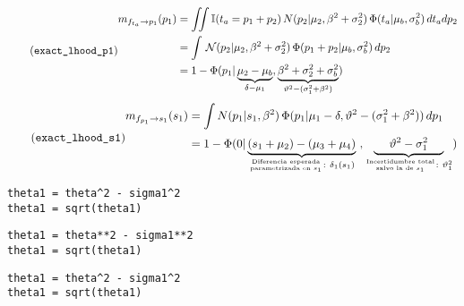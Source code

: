 \documentclass[article]{jss}
\newif\ifen
\newcommand{\en}[1]{\ifen#1\fi}
\newcommand{\N}{\mathcal{N}}
\newcommand\hfrac[2]{\genfrac{}{}{0pt}{}{#1}{#2}} %
\begin{document}
%
\begin{equation}\label{eq:m_fta_p_inicial} \tag{\texttt{exact\_lhood\_p1}}
\begin{split}
m_{f_{t_a} \rightarrow p_1}(p_1)  & = \iint \mathbb{I}( t_a = p_1 + p_2) \, N(p_2| \mu_2, \beta^2 + \sigma_2^2 ) \, \Phi (t_a| \mu_b , \sigma_b^2 ) \, dt_a dp_2 \\
& = \int  \, \N(p_2| \mu_2, \beta^2 + \sigma_2^2 ) \, \Phi (p_1 + p_2| \mu_b , \sigma_b^2 ) \, dp_2 \\
& = 1 - \Phi( p_1 | \underbrace{\mu_2 - \mu_b}_{\delta-\mu_1}, \underbrace{\beta^2 + \sigma_2^2 + \sigma_b^2}_{\vartheta^2 - (\sigma_1^2 + \beta^2)}) 
\end{split}
\end{equation}
%
\begin{equation}\label{eq:m_fp_s1} \tag{\texttt{exact\_lhood\_s1}}
\begin{split}
m_{f_{p_1} \rightarrow s_1}(s_1) & = \int N(p_1| s_1, \beta^2) \, \Phi(p_1| \mu_1-\delta, \vartheta^2 - (\sigma_1^2 + \beta^2)) \, dp_1 \\[0.1cm]
& = 1 - \Phi(0 | \underbrace{(s_1 + \mu_2) - (\mu_3 + \mu_4)}_{\hfrac{\text{Diferencia esperada}}{\text{parametrizada en $s_1$}}: \ \delta_1(s_1) } \ , \underbrace{\ \ \ \ \vartheta^2 - \sigma_1^2 \ \ \ \ }_{\hfrac{\text{Incertidumbre total}}{\text{salvo la de $s_1$}}: \ \vartheta_1^2})\end{split}
\end{equation}
%
\en{El mensaje $m_{f_{p_1} \rightarrow s_1}(s_1)$ es el likelihood exacto y computa la ``probabilidad de ganar dada la hipótesis $s_1$''.}
%
\en{Esto es probabilidad a priori de un resultado ganador si la verdadera habilidad del jugador fuera $s_1$.}
%
\en{En caso de conocer la habilidad, no existe incertidumbre asociacia por lo que hay que eliminarla la incertidumbre total.}
%
\begin{paracol}{3}
\begin{lstlisting}[backgroundcolor=\color{julia}]
theta1 = theta^2 - sigma1^2
theta1 = sqrt(theta1)
\end{lstlisting}  
 \switchcolumn
\begin{lstlisting}[backgroundcolor=\color{python}]
theta1 = theta**2 - sigma1**2
theta1 = sqrt(theta1)
\end{lstlisting} 
 \switchcolumn
\begin{lstlisting}[backgroundcolor=\color{r}]
theta1 = theta^2 - sigma1^2
theta1 = sqrt(theta1)
\end{lstlisting}   
\end{paracol}
\end{document}
